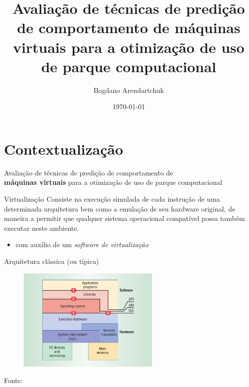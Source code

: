 \documentclass{beamer}
\institute{Universidade Tuiuti do Paraná}
\author{Bogdano Arendartchuk}
\title{Avaliação de técnicas de predição de comportamento de máquinas
virtuais para a otimização de uso de parque computacional}
\date{\today}
\begin{document}
\frame{\titlepage}

\section{Contextualização}

\begin{frame}{}
\begin{block}{}
\centering
Avaliação de técnicas de predição de comportamento de \\
\textbf{{\color{red}máquinas virtuais}}
para a otimização de uso de parque computacional
\end{block}
\end{frame}

\begin{frame}
\begin{block}{Virtualização}
Consiste na execução simulada de cada instrução de uma determinada
arquitetura bem como a emulação de seu hardware original, de maneira a
permitir que qualquer sistema operacional compatível possa também executar
neste ambiente.\cite{goldberg1974survey}
\end{block}
\begin{itemize}
\item com auxílio de um \emph{software de virtualização}
\end{itemize}
\end{frame}

\begin{frame}{Arquitetura clássica (ou típica)}
\begin{figure}
\centering
\includegraphics[height=5cm]{img/img-smith2005cla.png}
\end{figure}
\tiny{Fonte: \cite{smith2005architecture}}
\end{frame}
\end{document}
